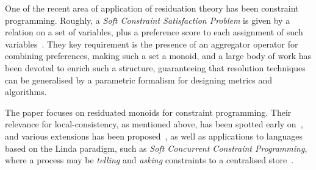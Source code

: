 \documentclass[a4paper]{elsarticle}
\newcommand{\1}{\mathbf{1}}
\begin{document}
One of the recent area of application of residuation theory has been constraint programming. 
%
Roughly, a  \emph{Soft Constraint Satisfaction Problem} 
is given by a relation on a set of variables, plus a preference 
score to each assignment of such variables~\cite{jacm97,schiex}. 
%
They key requirement is the presence of an aggregator operator for combining preferences, making such a set a monoid, and a large body 
of work has been devoted to enrich such a structure, guaranteeing that resolution techniques can be generalised by 
a parametric formalism for designing metrics and algorithms.
%

The paper focuses on residuated monoids for constraint programming. Their relevance for local-consistency, as mentioned above, has been spotted 
early on~\cite{residuation1,resCS}, and various extensions  has been proposed~\cite{ipl}, as well as applications to languages based on the Linda paradigm, such as 
\emph{Soft Concurrent Constraint Programming},  where a process may be \emph{telling} and \emph{asking} constraints to a centralised store~\cite{labelled}. 
\end{document}
